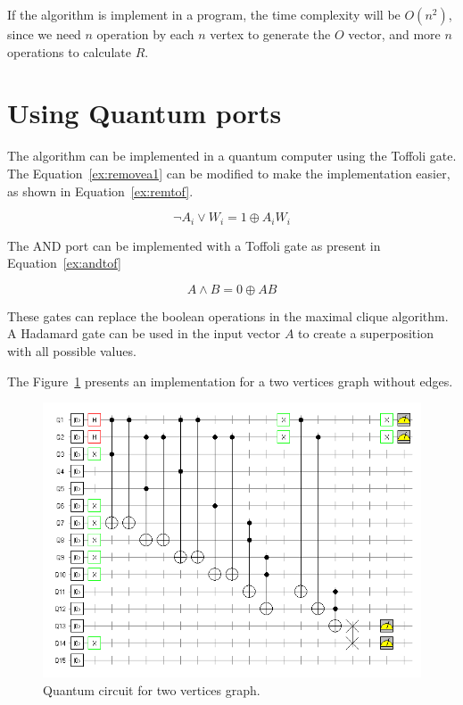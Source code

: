 \documentclass[a4paper,12pt]{article}
\begin{document}
If the algorithm is implement in a program, the time complexity will be $O(n^2)$, since we need $n$ operation by each $n$ vertex to generate the $O$ vector, and more $n$ operations to calculate $R$.

\section{Using Quantum ports}

The algorithm can be implemented in a quantum computer using the Toffoli gate. The Equation~\ref{ex:removea1} can be modified to make the implementation easier, as shown in Equation~\ref{ex:remtof}.

\begin{equation}
	\neg A_i \lor W_i = 1 \oplus A_i W_i \label{ex:remtof}
\end{equation}

The AND port can be implemented with a Toffoli gate as present in Equation~\ref{ex:andtof} 

\begin{equation}
	A \land B = 0 \oplus AB \label{ex:andtof}
\end{equation}

These gates can replace the boolean operations in the maximal clique algorithm. A Hadamard gate can be used in the input vector $A$ to create a superposition with all possible values.

The Figure~\ref{fig:qcircuit} presents an implementation for a two vertices graph without edges.

\begin{figure}[!ht]
	\label{fig:qcircuit}
	\centering
	\includegraphics[width=1\textwidth]{qclique}
	\caption{Quantum circuit for two vertices graph.}
\end{figure}
\end{document}
